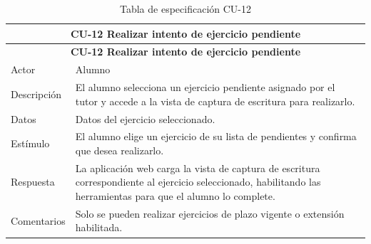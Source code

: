 \begin{longtable}{|p{4cm}|p{11cm}|}
\caption{Tabla de especificación CU-12}
\label{tab:cu12} \\

\hline
\multicolumn{2}{|c|}{\textbf{CU-12 Realizar intento de ejercicio pendiente}} \\
\hline
\endfirsthead

\hline
\multicolumn{2}{|c|}{\textbf{CU-12 Realizar intento de ejercicio pendiente}} \\
\hline
\endhead

\hline
\endfoot
\endlastfoot

Actor & Alumno \\
\hline

Descripción & El alumno selecciona un ejercicio pendiente asignado por el tutor y accede a la vista de captura de escritura para realizarlo. \\
\hline

Datos & Datos del ejercicio seleccionado. \\
\hline

Estímulo & El alumno elige un ejercicio de su lista de pendientes y confirma que desea realizarlo. \\
\hline

Respuesta & La aplicación web carga la vista de captura de escritura correspondiente al ejercicio seleccionado, habilitando las herramientas para que el alumno lo complete. \\
\hline

Comentarios & Solo se pueden realizar ejercicios de plazo vigente o extensión habilitada. \\
\hline

\end{longtable}

